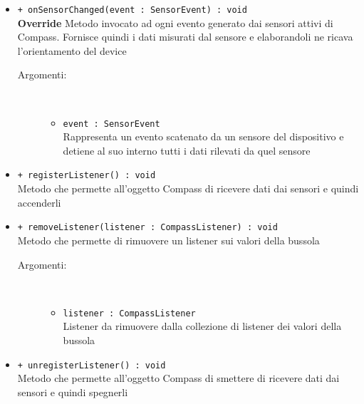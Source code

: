 \documentclass[../DefinizioneDiProdotto.tex]{subfiles}
\begin{document}
\begin{description}
\begin{itemize}
\begin{description}
		\end{description}
		\item \texttt{+ onSensorChanged(event : SensorEvent) : void}\\
		\textbf{Override} Metodo invocato ad ogni evento generato dai sensori attivi di Compass. Fornisce quindi i dati misurati dal sensore e elaborandoli ne ricava l'orientamento del device
		\begin{description}
			\item[Argomenti:] \
			\begin{itemize}
				\item \texttt{event : SensorEvent}\\
				Rappresenta un evento scatenato da un sensore del dispositivo e detiene al suo interno tutti i dati rilevati da quel sensore\end{itemize}
		\end{description}
		\item \texttt{+ registerListener() : void}\\
		Metodo che permette all'oggetto Compass di ricevere dati dai sensori e quindi accenderli
		\item \texttt{+ removeListener(listener : CompassListener) : void}\\
		Metodo che permette di rimuovere un listener sui valori della bussola
		\begin{description}
			\item[Argomenti:] \
			\begin{itemize}
				\item \texttt{listener : CompassListener}\\
				Listener da rimuovere dalla collezione di listener dei valori della bussola\end{itemize}
		\end{description}
		\item \texttt{+ unregisterListener() : void}\\
		Metodo che permette all'oggetto Compass di smettere di ricevere dati dai sensori e quindi spegnerli
	\end{itemize}
\end{description}
\end{document}
